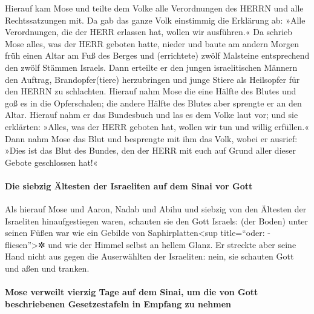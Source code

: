  Hierauf kam Mose und teilte dem Volke alle Verordnungen
des HERRN und alle Rechtssatzungen mit. Da gab das ganze Volk einstimmig
die Erklärung ab: »Alle Verordnungen, die der HERR erlassen hat, wollen
wir ausführen.«  Da schrieb Mose alles, was der HERR
geboten hatte, nieder und baute am andern Morgen früh einen Altar am Fuß
des Berges und (errichtete) zwölf Malsteine entsprechend den zwölf
Stämmen Israels.  Dann erteilte er den jungen
israelitischen Männern den Auftrag, Brandopfer(tiere) herzubringen und
junge Stiere als Heilsopfer für den HERRN zu schlachten. 
Hierauf nahm Mose die eine Hälfte des Blutes und goß es in die
Opferschalen; die andere Hälfte des Blutes aber sprengte er an den
Altar.  Hierauf nahm er das Bundesbuch und las es dem
Volke laut vor; und sie erklärten: »Alles, was der HERR geboten hat,
wollen wir tun und willig erfüllen.«  Dann nahm Mose das
Blut und besprengte mit ihm das Volk, wobei er ausrief: »Dies ist das
Blut des Bundes, den der HERR mit euch auf Grund aller dieser Gebote
geschlossen hat!«

\hypertarget{die-siebzig-uxe4ltesten-der-israeliten-auf-dem-sinai-vor-gott}{%
\paragraph{Die siebzig Ältesten der Israeliten auf dem Sinai vor
Gott}\label{die-siebzig-uxe4ltesten-der-israeliten-auf-dem-sinai-vor-gott}}

 Als hierauf Mose und Aaron, Nadab und Abihu und siebzig
von den Ältesten der Israeliten hinaufgestiegen waren, 
schauten sie den Gott Israels: (der Boden) unter seinen Füßen war wie
ein Gebilde von Saphirplatten\textless sup title=``oder:
-fliesen''\textgreater✲ und wie der Himmel selbst an hellem Glanz.
 Er streckte aber seine Hand nicht aus gegen die
Auserwählten der Israeliten: nein, sie schauten Gott und aßen und
tranken.

\hypertarget{mose-verweilt-vierzig-tage-auf-dem-sinai-um-die-von-gott-beschriebenen-gesetzestafeln-in-empfang-zu-nehmen}{%
\paragraph{Mose verweilt vierzig Tage auf dem Sinai, um die von Gott
beschriebenen Gesetzestafeln in Empfang zu
nehmen}\label{mose-verweilt-vierzig-tage-auf-dem-sinai-um-die-von-gott-beschriebenen-gesetzestafeln-in-empfang-zu-nehmen}}


